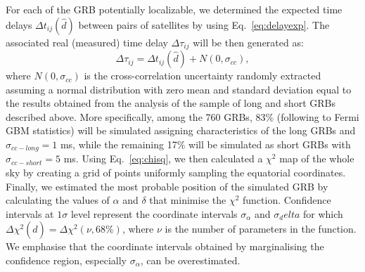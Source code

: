 \documentclass[]{spie}  %
\begin{document}
For each of the GRB potentially localizable, we determined the expected time delays $\Delta t_{ij}(\hat{d})$ between pairs of satellites by using Eq.~\ref{eq:delayexp}. The associated real (measured) time delay $\Delta \tau_{ij}$ will be then generated as:
\begin{equation} 
     \Delta \tau_{ij}=\Delta t_{ij}(\hat{d})+N(0,\sigma_{cc}),
\end{equation}              
where $N(0,\sigma_{cc})$ is the cross-correlation uncertainty randomly extracted assuming a normal distribution with zero mean and standard deviation equal to the results obtained from the analysis of the sample of long and short GRBs described above. More specifically, among the 760 GRBs, 83\% (following to Fermi GBM statistics) will be simulated assigning characteristics of the long GRBs and $\sigma_{cc-long} = 1$ ms, while the remaining 17\% will be simulated as short GRBs with $\sigma_{cc-short} = 5$ ms.
Using Eq.~\ref{eq:chisq}, we then calculated a $\chi^2$ map of the whole sky by creating a grid of points uniformly sampling the equatorial coordinates. Finally, we estimated the most probable position of the simulated GRB by calculating the values of $\alpha$ and $\delta$ that minimise the $\chi^2$ function. Confidence intervals at $1\sigma$ level represent the coordinate intervals $\sigma_\alpha$ and $\sigma_delta$ for which $\Delta \chi^2 (\hat{d}) = 
\Delta 
\chi^2(\nu, 68\%)$, where $\nu$ is the number of parameters in the function. We emphasise that the coordinate intervals obtained by marginalising the confidence region, especially $\sigma_\alpha$, can be overestimated. 
\end{document}
